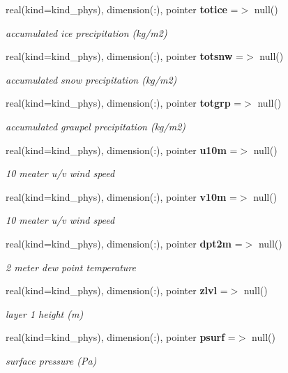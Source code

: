 \begin{DoxyCompactItemize}
real(kind=kind\+\_\+phys), dimension(\+:), pointer \textbf{ totice} =$>$ null()
\begin{DoxyCompactList}\small\item\em accumulated ice precipitation (kg/m2) \end{DoxyCompactList}\item 
real(kind=kind\+\_\+phys), dimension(\+:), pointer \textbf{ totsnw} =$>$ null()
\begin{DoxyCompactList}\small\item\em accumulated snow precipitation (kg/m2) \end{DoxyCompactList}\item 
real(kind=kind\+\_\+phys), dimension(\+:), pointer \textbf{ totgrp} =$>$ null()
\begin{DoxyCompactList}\small\item\em accumulated graupel precipitation (kg/m2) \end{DoxyCompactList}\item 
real(kind=kind\+\_\+phys), dimension(\+:), pointer \textbf{ u10m} =$>$ null()
\begin{DoxyCompactList}\small\item\em 10 meater u/v wind speed \end{DoxyCompactList}\item 
real(kind=kind\+\_\+phys), dimension(\+:), pointer \textbf{ v10m} =$>$ null()
\begin{DoxyCompactList}\small\item\em 10 meater u/v wind speed \end{DoxyCompactList}\item 
real(kind=kind\+\_\+phys), dimension(\+:), pointer \textbf{ dpt2m} =$>$ null()
\begin{DoxyCompactList}\small\item\em 2 meter dew point temperature \end{DoxyCompactList}\item 
real(kind=kind\+\_\+phys), dimension(\+:), pointer \textbf{ zlvl} =$>$ null()
\begin{DoxyCompactList}\small\item\em layer 1 height (m) \end{DoxyCompactList}\item 
real(kind=kind\+\_\+phys), dimension(\+:), pointer \textbf{ psurf} =$>$ null()
\begin{DoxyCompactList}\small\item\em surface pressure (Pa) \end{DoxyCompactList}\item 

\end{DoxyCompactItemize}
